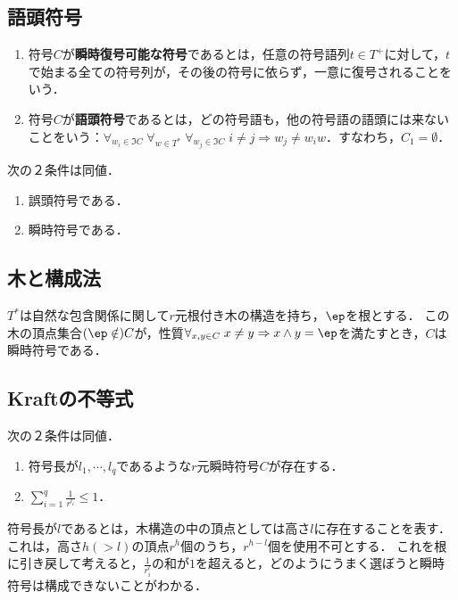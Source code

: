 \documentclass[uplatex,dvipdfmx]{jsreport}
\begin{document}
\subsection{語頭符号}

\begin{definition}\mbox{}
    \begin{enumerate}
        \item 符号$C$が\textbf{瞬時復号可能な符号}であるとは，任意の符号語列$t\in T^+$に対して，$t$で始まる全ての符号列が，その後の符号に依らず，一意に復号されることをいう．
        \item 符号$C$が\textbf{語頭符号}であるとは，どの符号語も，他の符号語の語頭には来ないことをいう：$\forall_{w_i\in\Im C}\;\forall_{w\in T^*}\;\forall_{w_j\in\Im C}\;i\ne j\Rightarrow w_j\ne w_iw$．すなわち，$C_1=\emptyset$．
    \end{enumerate}
\end{definition}

\begin{theorem}
    次の２条件は同値．
    \begin{enumerate}
        \item 誤頭符号である．
        \item 瞬時符号である．
    \end{enumerate}
\end{theorem}

\subsection{木と構成法}


\begin{discussion}
    $T^*$は自然な包含関係に関して$r$元根付き木の構造を持ち，$\ep$を根とする．
    この木の頂点集合$(\ep\notin)C$が，性質$\forall_{x,y\in C}\;x\ne y\Rightarrow x\land y=\ep$を満たすとき，$C$は瞬時符号である．
\end{discussion}

\subsection{Kraftの不等式}

\begin{theorem}[Kraft 49]
    次の２条件は同値．
    \begin{enumerate}
        \item 符号長が$l_1,\cdots,l_q$であるような$r$元瞬時符号$C$が存在する．
        \item $\sum^q_{i=1}\frac{1}{r^{l_i}}\le 1$．
    \end{enumerate}
\end{theorem}
\begin{remarks}
    符号長が$l$であるとは，木構造の中の頂点としては高さ$l$に存在することを表す．
    これは，高さ$h(>l)$の頂点$r^h$個のうち，$r^{h-l}$個を使用不可とする．
    これを根に引き戻して考えると，$\frac{1}{r^l_i}$の和が$1$を超えると，どのようにうまく選ぼうと瞬時符号は構成できないことがわかる．
\end{remarks}
\end{document}
